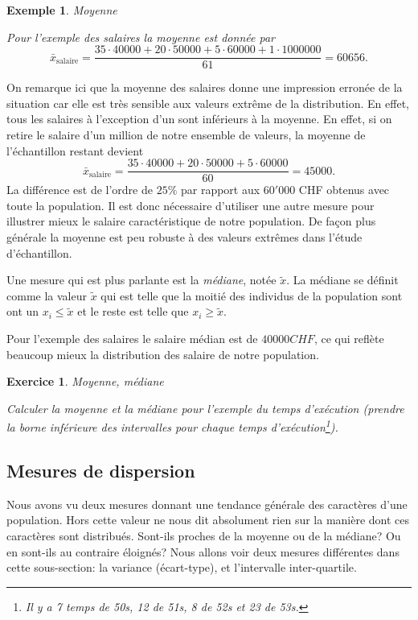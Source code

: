 \documentclass[a4paper,12pt]{book}
\newtheorem*{exemple}{Exemple}
\newtheorem*{exercice}{Exercice}
\begin{document}
\begin{exemple}{Moyenne}

Pour l'exemple des salaires la moyenne est donnée par
\begin{equation}
 \bar{x}_{\textrm{salaire}}=\frac{35\cdot40000+20\cdot50000+5\cdot60000+1\cdot1000000}{61}=60656.
\end{equation}
\end{exemple}
On remarque ici que la moyenne des salaires donne une impression erronée de la situation car elle est très sensible aux valeurs extrême de la distribution.
En effet, tous les salaires à l'exception d'un sont inférieurs à la moyenne. En effet, si on retire le salaire d'un million de notre ensemble de valeurs, 
la moyenne de l'échantillon restant devient
\begin{equation}
 \bar{x}_{\textrm{salaire}}=\frac{35\cdot40000+20\cdot50000+5\cdot60000}{60}=45000.
\end{equation}
La différence est de l'ordre de $25\%$ par rapport aux $60'000$ CHF obtenus avec toute la population.
Il est donc nécessaire d'utiliser une autre mesure pour illustrer mieux le salaire caractéristique de notre population.
De façon plus générale la moyenne est peu robuste à des valeurs extrêmes dans l'étude d'échantillon.

Une mesure qui est plus parlante est la \textit{médiane}, notée $\tilde{x}$. La médiane se définit comme la valeur $\tilde{x}$ qui est telle que
la moitié des individus de la population sont ont un $x_i\leq \tilde{x}$ et le reste est telle que $x_i\geq\tilde{x}$.

Pour l'exemple des salaires le salaire médian est de $40000 CHF$, ce qui reflète beaucoup mieux la distribution des salaire de notre population.
\begin{exercice}{Moyenne, médiane}

 Calculer la moyenne et la médiane pour l'exemple du temps d'exécution (prendre la borne inférieure des intervalles pour chaque temps 
 d'exécution\footnote{Il y a 7 temps de 50s, 12 de 51s, 8 de 52s et 23 de 53s.}).
\end{exercice}


\subsection{Mesures de dispersion}

Nous avons vu deux mesures donnant une tendance générale des caractères d'une population. Hors cette valeur ne nous dit absolument rien
sur la manière dont ces caractères sont distribués. Sont-ils proches de la moyenne ou de la médiane? Ou en sont-ils au contraire éloignés?
Nous allons voir deux mesures différentes dans cette sous-section: la variance (écart-type), et l'intervalle inter-quartile.
\end{document}

